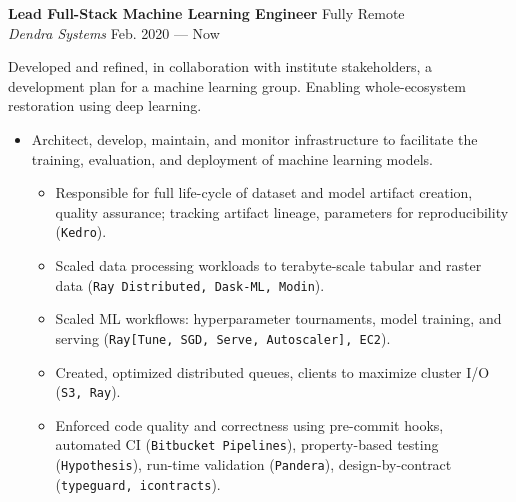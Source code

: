 \documentclass[a4paper,12pt]{article}
\newcommand{\ressubheading}[4]{{\begin{minipage}{\textwidth}
        \textbf{#1} \hfill #2 \\
        \textit{#3} \hfill #4 \\
        \end{minipage}}}
\begin{document}
\ressubheading{Lead Full-Stack Machine Learning Engineer}{Fully Remote}{Dendra Systems}{Feb. 2020 --- Now}

\vspace{-6pt} Developed and refined, in collaboration with institute stakeholders, a development plan for a machine learning group. Enabling whole-ecosystem restoration using deep learning.
\begin{itemize}
\item Architect, develop, maintain, and monitor infrastructure to facilitate the training, evaluation, and deployment of machine learning models.
	\begin{itemize}
	\item Responsible for full life-cycle of dataset and model artifact creation, quality assurance; tracking artifact lineage, parameters for reproducibility (\texttt{Kedro}).
	\item Scaled data processing workloads to terabyte-scale tabular and raster data (\texttt{Ray Distributed, Dask-ML, Modin}).
	\item Scaled ML workflows: hyperparameter tournaments, model training, and serving (\texttt{Ray[Tune, SGD, Serve, Autoscaler], EC2}).
	\item Created, optimized distributed queues, clients to maximize cluster I/O (\texttt{S3, Ray}).
    \item Enforced code quality and correctness using pre-commit hooks, automated CI (\texttt{Bitbucket Pipelines}), property-based testing (\texttt{Hypothesis}), run-time validation (\texttt{Pandera}), design-by-contract (\texttt{typeguard, icontracts}).
	\end{itemize}


\end{itemize}
\end{document}
